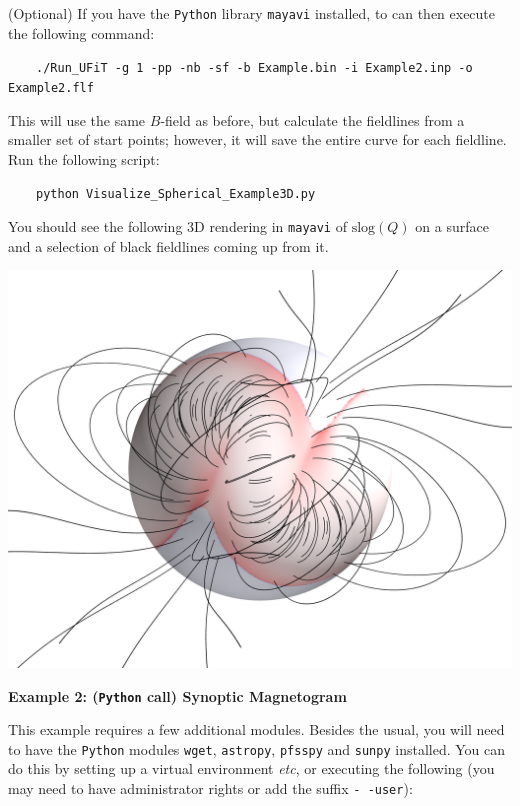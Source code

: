 \documentclass[12pt,twoside]{article}
\begin{document}
\newpage

(Optional) If you have the \texttt{Python} library \texttt{mayavi} installed, to can then execute the following command:

$\quad\quad$\texttt{./Run\_UFiT -g 1 -pp -nb -sf -b Example.bin -i Example2.inp -o Example2.flf}

This will use the same $B$-field as before, but calculate the fieldlines from a smaller set of start points; however, it will save the entire curve for each fieldline. Run the following script:

$\quad\quad$\texttt{python Visualize\_Spherical\_Example3D.py}

You should see the following 3D rendering in \texttt{mayavi} of $\mathrm{slog}(Q)$ on a surface and a selection of black fieldlines coming up from it.

\begin{center}
\includegraphics[scale=0.2]{Spherical_Example3D.png}
\end{center}

\vspace{2mm}
{\large \textbf{Example 2: (\texttt{Python} call) Synoptic Magnetogram}}

This example requires a few additional modules. Besides the usual, you will need to have the \texttt{Python} modules \texttt{wget}, \texttt{astropy}, \texttt{pfsspy} and \texttt{sunpy} installed. You can do this by setting up a virtual environment \textit{etc}, or executing the following (you may need to have administrator rights or add the suffix \texttt{-\,-user}):
\end{document}
